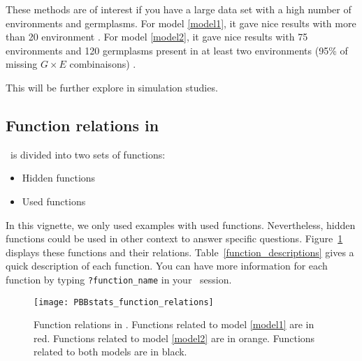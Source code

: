 These methods are of interest if you have a large data set with a high number of environments and germplasms.
For model \ref{model1}, it gave nice results with more than 20 environment \citep{riviere_hierarchical_2015}.
For model \ref{model2}, it gave nice results with 75 environments and 120 germplasms present in at least two environments (95\% of missing $G \times E$ combinaisons) \citep{riviere_hierarchical_2015-1}.

This will be further explore in simulation studies.

\subsection{Function relations in \pack}

\pack~is divided into two sets of functions:


\begin{itemize}
\item Hidden functions
\item Used functions
\end{itemize}


In this vignette, we only used examples with used functions.
Nevertheless, hidden functions could be used in other context to answer specific questions.
Figure~\ref{function_relations} displays these functions and their relations.
Table~\ref{function_descriptions} gives a quick description of each function.
You can have more information for each function by typing \texttt{?function\_name} in your \R~session.


\begin{figure}[H]
\begin{center}
\texttt{[image: PBBstats\_function\_relations]}
\end{center}
\caption{Function relations in \pack.
Functions related to model \ref{model1} are in red.
Functions related to model \ref{model2} are in orange.
Functions related to both models are in black.
}
\label{function_relations}
\end{figure}

